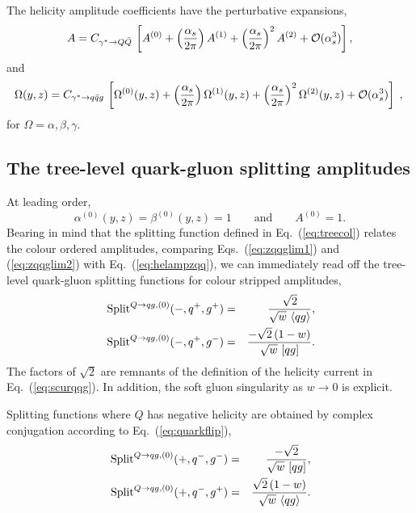 \documentclass[paper,notoc,nohyper]{JHEP3}
\def\Split{\, {\rm Split}}
\begin{document}
The helicity amplitude coefficients have the perturbative expansions,
\begin{equation}
A =  C_{\gamma^* \to Q\bar Q}\, \left[
A^{(0)}  
+ \left(\frac{\alpha_s}{2\pi}\right) A^{(1)}  
+ \left(\frac{\alpha_s}{2\pi}\right)^2 A^{(2)} 
+ {\cal O}(\alpha_s^3) \right],
\end{equation}
and
\begin{equation}
\Omega(y,z) =  C_{\gamma^* \to q\bar q g}\, \left[
\Omega^{(0)}(y,z)  
+ \left(\frac{\alpha_s}{2\pi}\right) \Omega^{(1)}(y,z)  
+ \left(\frac{\alpha_s}{2\pi}\right)^2 \Omega^{(2)}(y,z) 
+ {\cal O}(\alpha_s^3) \right] \;,\nonumber \\
\end{equation}
for $\Omega = \alpha,\beta,\gamma$. 


\subsection{The tree-level quark-gluon splitting amplitudes}

At leading order,
\begin{equation}
\alpha^{(0)}(y,z) = \beta^{(0)}(y,z) = 1\qquad
\mbox{and}\qquad A^{(0)}=1.
\end{equation}
Bearing in mind that the splitting function defined in Eq.~(\ref{eq:treecol}) relates the colour ordered
amplitudes,  comparing Eqs.~(\ref{eq:zqqglim1}) and (\ref{eq:zqqglim2}) with Eq.~(\ref{eq:helampzqq}),
we can immediately read off the tree-level quark-gluon splitting functions for colour stripped amplitudes,
\begin{eqnarray}
\label{eq:qgtree}
\Split^{Q \to qg,(0)}(-,q^{+},g^{+})&=&
\frac{\sqrt{2}}{\sqrt{w} ~\langle qg \rangle},\nonumber \\
\Split^{Q \to qg,(0)}(-,q^{+},g^{-})&=&
\frac{-\sqrt{2}\, (1-w)}{\sqrt{w} ~[ qg ]}.
\end{eqnarray}
The factors of $\sqrt{2}$ are remnants of the definition of the helicity current in Eq.~(\ref{eq:scurqqg}).
In addition, the soft gluon singularity as $w \to 0$ is explicit.

Splitting functions where $Q$ has negative helicity are obtained by complex
conjugation according to Eq.~(\ref{eq:quarkflip}),
\begin{eqnarray}
\label{eq:qgtreeflip}
\Split^{Q \to qg,(0)}(+,q^{-},g^{-})&=&
\frac{-\sqrt{2}}{\sqrt{w} ~[ qg ]},\nonumber \\
\Split^{Q \to qg,(0)}(+,q^{-},g^{+})&=&
\frac{\sqrt{2}\, (1-w)}{\sqrt{w} ~\langle qg \rangle}.
\end{eqnarray}
\end{document}
